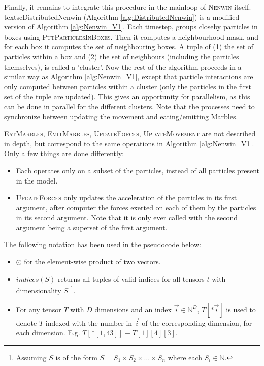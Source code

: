 Finally, it remains to integrate this procedure in the mainloop of \textsc{Nenwin} itself. textsc{DistributedNenwin} (Algorithm \ref{alg:DistributedNenwin}) is a modified version of Algorithm \ref{alg:Nenwin_V1}. Each timestep, groups closeby particles in boxes using \textsc{PutParticlesInBoxes}. Then it computes a neighbourhood mask, and for each box it computes the set of neighbouring boxes. A tuple of (1) the set of particles within a box and (2) the set of neighbours (including the particles themselves), is called a 'cluster'. Now the rest of the algorithm proceeds in a similar way as Algorithm \ref{alg:Nenwin_V1}, except that particle interactions are only computed between particles within a cluster (only the particles in the first set of the tuple are updated). This gives an opportunity for parallelism, as this can be done in parallel for the different clusters. Note that the processes need to synchronize between updating the movement and eating/emitting Marbles. 


\textsc{EatMarbles}, \textsc{EmitMarbles}, \textsc{UpdateForces}, \textsc{UpdateMovement} are not described in depth, but correspond to the same operations in Algorithm \ref{alg:Nenwin_V1}. Only a few things are done differently:
\begin{itemize}
	\item Each operates only on a subset of the particles, instead of all particles present in the model.
	\item \textsc{UpdateForces} only updates the acceleration of the particles in its first argument, after computer the forces exerted on each of them by the particles in its second argument. Note that it is only ever called with the second argument being a superset of the first argument.
\end{itemize}


The following notation has been used in the pseudocode below:
\begin{itemize}
	\item $\odot$ for the element-wise product of two vectors.
	\item $indices(S)$ returns all tuples of valid indices for all tensors $t$ with dimensionality $S$ \footnote{Assuming $S$ is of the form $S = S_1 \times S_2 \times \dots \times S_n$ where each $S_i \in \mathbb{N}$.}.
	\item For any tensor $T$ with $D$ dimensions and an index $\vec{i} \in \mathbb{N}^D$, $T[*\vec{i}]$ is used to denote $T$ indexed with the number in $\vec{i}$ of the corresponding dimension, for each dimension. E.g. $T[*[1, 4 3]] \equiv T[1][4][3]$.
\end{itemize}

